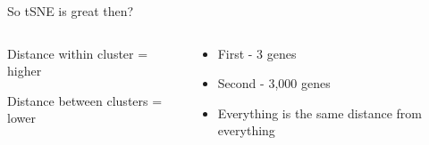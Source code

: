 \begin{frame}[allowframebreaks]{So tSNE is great then?}
\begin{columns}
\begin{column}{0.33\textwidth}
        \vspace{1em}

Distance within cluster = higher

\vspace{1em}
        
Distance between clusters = lower
    \end{column}
    \begin{column}{0.33\textwidth}
        \begin{itemize}
            \item First - 3 genes
            \item Second -  3,000 genes
            \item Everything is the same distance from everything
        \end{itemize}
    \end{column}
    \end{columns}
\end{frame}

